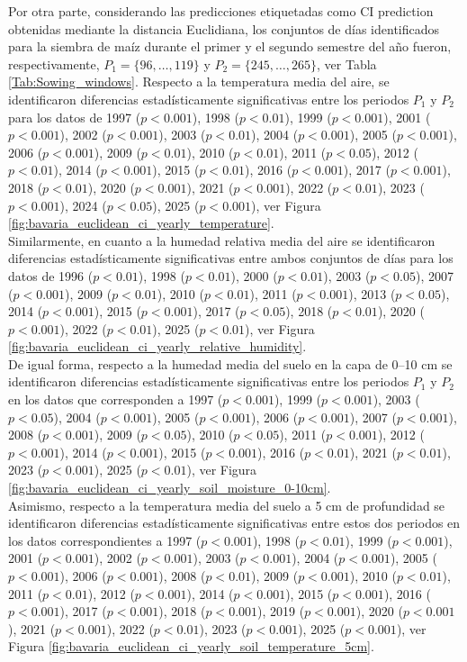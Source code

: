 Por otra parte, considerando las predicciones etiquetadas como CI prediction obtenidas mediante la distancia Euclidiana, los conjuntos de días identificados para la siembra de maíz durante el primer y el segundo semestre del año fueron, respectivamente, $P_1=\{96,\ldots, 119\}$ y $P_2=\{245,\ldots,265\}$, ver Tabla \ref{Tab:Sowing_windows}. Respecto a la temperatura media del aire, se identificaron diferencias estadísticamente significativas entre los periodos $P_1$ y $P_2$ para los datos de 1997	($p<0.001$), 1998	($p<0.01$), 1999	($p<0.001$), 2001	($p<0.001$), 2002	($p<0.001$), 2003	($p<0.01$), 2004	($p<0.001$), 2005	($p<0.001$), 2006	($p<0.001$), 2009	($p<0.01$), 2010	($p<0.01$), 2011	($p<0.05$), 2012	($p<0.01$), 2014	($p<0.001$), 2015	($p<0.01$), 2016	($p<0.001$), 2017	($p<0.001$), 2018	($p<0.01$), 2020	($p<0.001$), 2021	($p<0.001$), 2022	($p<0.01$), 2023	($p<0.001$), 2024	($p<0.05$), 2025	($p<0.001$), ver Figura \ref{fig:bavaria_euclidean_ci_yearly_temperature}.\\

Similarmente, en cuanto a la humedad relativa media del aire se identificaron diferencias estadísticamente significativas entre ambos conjuntos de días para los datos de 1996	($p<0.01$), 1998	($p<0.01$), 2000	($p<0.01$), 2003	($p<0.05$), 2007	($p<0.001$), 2009	($p<0.01$), 2010	($p<0.01$), 2011	($p<0.001$), 2013	($p<0.05$), 2014	($p<0.001$), 2015	($p<0.001$), 2017	($p<0.05$), 2018	($p<0.01$), 2020	($p<0.001$), 2022	($p<0.01$), 2025	($p<0.01$), ver Figura \ref{fig:bavaria_euclidean_ci_yearly_relative_humidity}.\\


De igual forma, respecto a la humedad media del suelo en la capa de 0--10 cm se identificaron diferencias estadísticamente significativas entre los periodos $P_1$ y $P_2$ en los datos que corresponden a 1997	($p<0.001$), 1999	($p<0.001$), 2003	($p<0.05$), 2004	($p<0.001$), 2005	($p<0.001$), 2006	($p<0.001$), 2007	($p<0.001$), 2008	($p<0.001$), 2009	($p<0.05$), 2010	($p<0.05$), 2011	($p<0.001$), 2012	($p<0.001$), 2014	($p<0.001$), 2015	($p<0.001$), 2016	($p<0.01$), 2021	($p<0.01$), 2023	($p<0.001$), 2025	($p<0.01$), ver Figura \ref{fig:bavaria_euclidean_ci_yearly_soil_moisture_0-10cm}.\\

Asimismo, respecto a la temperatura media del suelo a 5 cm de profundidad se identificaron diferencias estadísticamente significativas entre estos dos periodos en los datos correspondientes a 1997	($p<0.001$), 1998	($p<0.01$), 1999	($p<0.001$), 2001	($p<0.001$), 2002	($p<0.001$), 2003	($p<0.001$), 2004	($p<0.001$), 2005	($p<0.001$), 2006	($p<0.001$), 2008	($p<0.01$), 2009	($p<0.001$), 2010	($p<0.01$), 2011	($p<0.01$), 2012	($p<0.001$), 2014	($p<0.001$), 2015	($p<0.001$), 2016	($p<0.001$), 2017	($p<0.001$), 2018	($p<0.001$), 2019	($p<0.001$), 2020	($p<0.001$), 2021	($p<0.001$), 2022	($p<0.01$), 2023	($p<0.001$), 2025	($p<0.001$), ver Figura \ref{fig:bavaria_euclidean_ci_yearly_soil_temperature_5cm}.\\

